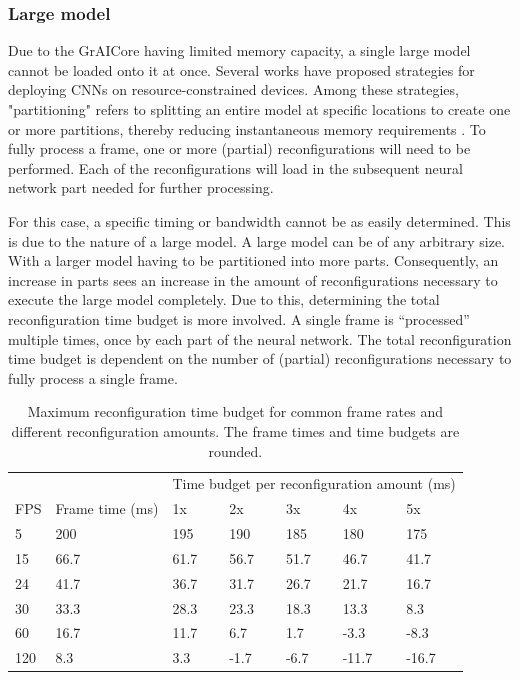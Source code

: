 \subsubsection{Large model}

Due to the GrAICore having limited memory capacity, a single large model cannot be loaded onto it at once.
Several works have proposed strategies for deploying CNNs on resource-constrained devices.
Among these strategies, "partitioning" refers to splitting an entire model at specific locations to create one or more partitions, thereby reducing instantaneous memory requirements \cite{kaboubiHybridPartitioningEmbedded2023}.
To fully process a frame, one or more (partial) reconfigurations will need to be performed.
Each of the reconfigurations will load in the subsequent neural network part needed for further processing.

For this case, a specific timing or bandwidth cannot be as easily determined.
This is due to the nature of a large model. A large model can be of any arbitrary size.
With a larger model having to be partitioned into more parts.
Consequently, an increase in parts sees an increase in the amount of reconfigurations necessary to execute the large model completely.
Due to this, determining the total reconfiguration time budget is more involved.
A single frame is ``processed'' multiple times, once by each part of the neural network.
The total reconfiguration time budget is dependent on the number of (partial) reconfigurations necessary to fully process a single frame.

\begin{table}[hbtp]
\centering
\begin{tabular}{@{}lllllll@{}}
\toprule
    &            & \multicolumn{5}{l}{Time budget per reconfiguration amount (ms)} \\
FPS & Frame time (ms) & 1x         & 2x          & 3x         & 4x         & 5x         \\ \midrule
5   & 200  & 195  & 190  & 185  & 180   & 175   \\
15  & 66.7 & 61.7 & 56.7 & 51.7 & 46.7  & 41.7  \\
24  & 41.7 & 36.7 & 31.7 & 26.7 & 21.7  & 16.7  \\
30  & 33.3 & 28.3 & 23.3 & 18.3 & 13.3  & 8.3   \\
60  & 16.7 & 11.7 & 6.7  & 1.7  & -3.3  & -8.3  \\
120 & 8.3  & 3.3  & -1.7 & -6.7 & -11.7 & -16.7 \\ \bottomrule
\end{tabular}
\caption{Maximum reconfiguration time budget for common frame rates and different reconfiguration amounts. The frame times and time budgets are rounded.}
\label{tab:common_fps_reconfig_amount}
\end{table}


